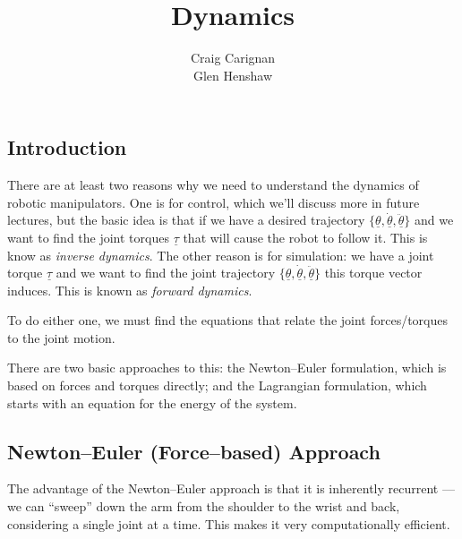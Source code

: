 \documentclass[fleqn]{article}
\title{Dynamics}
\author{Craig Carignan\\Glen Henshaw}
\begin{document}
\maketitle


\subsection{Introduction}

There are at least two reasons why we need to understand the dynamics of robotic manipulators. One is for control, which we'll discuss more in future lectures, but the basic idea is that if we have a desired trajectory $\{\underline{\theta}, \underline{\dot{\theta}}, \underline{\ddot{\theta}}\}$ and we want to find the joint torques $\underline{\tau}$ that will cause the robot to follow it. This is know as \emph{inverse dynamics}. The other reason is for simulation: we have a joint torque $\underline{\tau}$ and we want to find the joint trajectory $\{\underline{\theta}, \underline{\dot{\theta}}, \underline{\ddot{\theta}}\}$ this torque vector induces. This is known as \emph{forward dynamics}.

To do either one, we must find the equations that relate the joint forces/torques to the joint motion.

There are two basic approaches to this: the Newton--Euler formulation, which is based on forces and torques directly; and the Lagrangian formulation, which starts with an equation for the energy of the system.

\subsection{Newton--Euler (Force--based) Approach}

The advantage of the Newton--Euler approach is that it is inherently recurrent --- we can ``sweep'' down the arm from the shoulder to the wrist and back, considering a single joint at a time. This makes it very computationally efficient.
\end{document}
